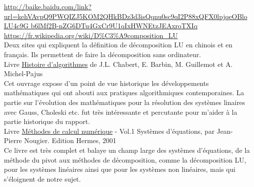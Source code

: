 \documentclass[a4paper,12pt]{report}
\begin{document}
\url{http://baike.baidu.com/link?
url=kehVAvpQ9PWQIZJ5KOM2QHkBDz3d3isQqnu0sc9qI2P88xQFX0lpjqeOBloLU4c9G
b6lMf2B-nZG6DTu4GxCr9U1qIxHWNEtzJEAxroTXIq}
\url{https://fr.wikipedia.org/wiki/D%C3%A9composition_LU}\\
Deux sites qui expliquent la définition de décomposition LU en chinois et en français. Ils
permettent de faire la décomposition sans ordinateur.\\

Livre \underline{Histoire d’algorithmes} de J.L. Chabert, E. Barbin, M. Guillemot et A. Michel-Pajus\\
Cet ouvrage expose d'un point de vue historique les développements mathématiques qui ont
abouti aux pratiques algorithmiques contemporaines. La partie sur l’évolution des
mathématiques pour la résolution des systèmes linaires avec Gauss, Choleski etc. fut très
intéressante et percutante pour m’aider à la partie historique du rapport.\\

Livre \underline{Méthodes de calcul numérique} - Vol.1 Systèmes d'équations, par Jean-Pierre Nougier. Edition Hermes, 2001\\
Ce livre est très complet et balaye un champ large des systèmes d'équations, de la méthode du pivot aux méthodes de décomposition, comme la décomposition LU, pour les systèmes linéaires ainsi que pour les systèmes non linéaires, mais qui s'éloignent de notre sujet.
\end{document}
